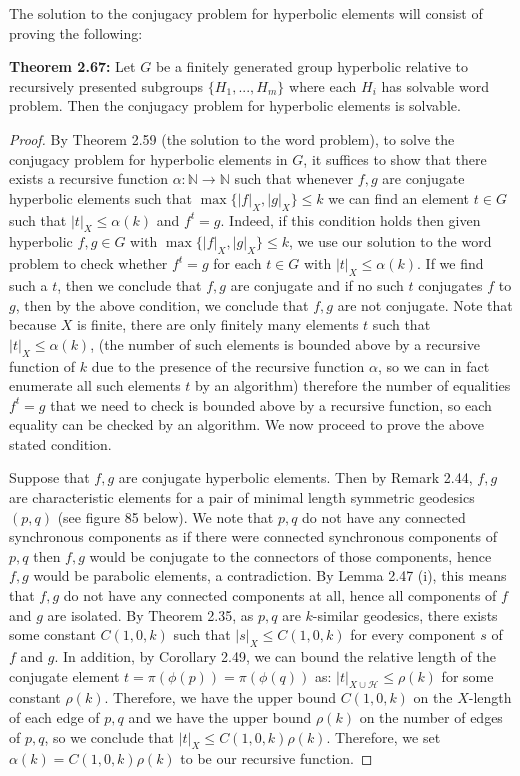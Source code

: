 \documentclass[12pt]{article}
\newcommand{\vs}{\vskip10pt}
\begin{document}
	The solution to the conjugacy problem for hyperbolic elements will consist of proving the following: 
	
	\vs 
	
	\textbf{Theorem 2.67: } Let $G$ be a finitely generated group hyperbolic relative to recursively presented subgroups $\{H_1,...,H_m\}$ where each $H_i$ has solvable word problem. Then the conjugacy problem for hyperbolic elements is solvable. 
	
	\begin{proof}
			By Theorem 2.59 (the solution to the word problem), to solve the conjugacy problem for hyperbolic elements in $G$, it suffices to show that there exists a recursive function $\alpha: \mathbb{N} \rightarrow \mathbb{N}$ such that whenever $f,g$ are conjugate hyperbolic elements such that $\max\{ \vert f \vert_X, \vert g \vert_X \} \leq k$ we can find an element $t \in G$ such that $\vert t \vert_X \leq \alpha(k)$ and $f^t = g$. Indeed, if this condition holds then given hyperbolic $f,g \in G$ with $\max\{ \vert f \vert_X, \vert g \vert_X \} \leq k$, we use our solution to the word problem to check whether $f^t = g$ for each $t \in G$ with $\vert t \vert_X \leq \alpha(k)$. If we find such a $t$, then we conclude that $f,g$ are conjugate and if no such $t$ conjugates $f$ to $g$, then by the above condition, we conclude that $f,g$ are not conjugate. Note that because $X$ is finite, there are only finitely many elements $t$ such that $\vert t \vert_X \leq \alpha(k)$, (the number of such elements is bounded above by a recursive function of $k$ due to the presence of the recursive function $\alpha$, so we can in fact enumerate all such elements $t$ by an algorithm) therefore the number of equalities $f^t = g$ that we need to check is bounded above by a recursive function, so each equality can be checked by an algorithm. We now proceed to prove the above stated condition. 
		
		\vs 
		
		Suppose that $f,g$ are conjugate hyperbolic elements. Then by Remark 2.44, $f,g$ are characteristic elements for a pair of minimal length symmetric geodesics $(p,q)$ (see figure 85 below). We note that $p,q$ do not have any connected synchronous components as if there were connected synchronous components of $p,q$ then $f,g$ would be conjugate to the connectors of those components, hence $f,g$ would be parabolic elements, a contradiction. By Lemma 2.47 (i), this means that $f,g$ do not have any connected components at all, hence all components of $f$ and $g$ are isolated. By Theorem 2.35, as $p,q$ are $k$-similar geodesics, there exists some constant $C(1,0,k)$ such that $\vert s \vert_X \leq C(1,0,k)$ for every component $s$ of $f$ and $g$. In addition, by Corollary 2.49, we can bound the relative length of the conjugate element $t = \pi(\phi(p)) = \pi(\phi(q))$ as: $\vert t \vert_{X \cup \mathcal{H}} \leq \rho(k)$ for some constant $\rho(k)$. Therefore, we have the upper bound $C(1,0,k)$ on the $X$-length of each edge of $p,q$ and we have the upper bound $\rho(k)$ on the number of edges of $p,q$, so we conclude that $\vert t \vert_X \leq C(1,0,k)\rho(k)$. Therefore, we set $\alpha(k) = C(1,0,k)\rho(k)$ to be our recursive function. 
		

\end{proof}
\end{document}
